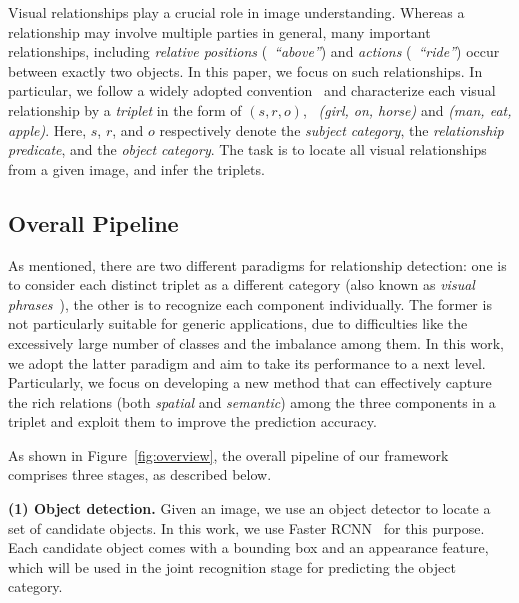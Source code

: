 \documentclass[10pt,twocolumn,letterpaper]{article}
\begin{document}
Visual relationships play a crucial role in image understanding.
Whereas a relationship may involve multiple parties in general,
many important relationships, including
\emph{relative positions} (\eg~\emph{``above''}) and
\emph{actions} (\eg~\emph{``ride''}) occur between exactly two objects.  
In this paper, we focus on such relationships.
%
In particular, we follow a widely adopted convention~\cite{sadeghi2011recognition,lu2016visual}
and characterize each visual relationship by a \emph{triplet}
in the form of $(s, r, o)$, 
\eg~\emph{(girl, on, horse)} and \emph{(man, eat, apple)}.
%
Here, $s$, $r$, and $o$ respectively
denote the \emph{subject category}, the \emph{relationship predicate}, and
the \emph{object category}. 
%
The task is to locate all visual relationships from a given image, 
and infer the triplets. 

\subsection{Overall Pipeline}

As mentioned, there are two different paradigms for relationship detection:
one is to consider each distinct triplet as a different category 
(also known as \emph{visual phrases}~\cite{sadeghi2011recognition}), 
the other is to recognize each component individually.
%
The former is not particularly suitable for generic applications,   
due to difficulties like the excessively large number of classes and 
the imbalance among them.
%
In this work, we adopt the latter paradigm and aim to take its 
performance to a next level.
Particularly, we focus on developing a new method that can effectively 
capture the rich relations (both \emph{spatial} and \emph{semantic}) 
among the three components in a triplet 
and exploit them to improve the prediction accuracy.

As shown in Figure~\ref{fig:overview}, 
the overall pipeline of our framework comprises three stages, 
as described below.

\textbf{(1) Object detection.} 
Given an image, we use an object detector to locate a set of candidate objects.
In this work, we use Faster RCNN~\cite{ren2015fasterrcnn} for this purpose.
Each candidate object comes with a bounding box and 
an appearance feature,
which will be used in the joint recognition stage for
predicting the object category.
\end{document}
